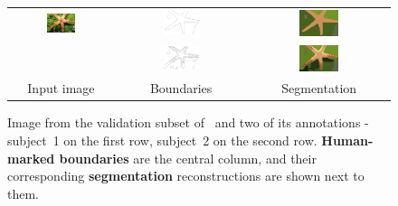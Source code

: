\begin{figure}[ht!]
\begin{center}
  \begin{tabular}{ c c c }
  \includegraphics[width=0.3\textwidth]{images/examples/starfish/starfish.png} &
  \includegraphics[width=0.3\textwidth,frame]{images/examples/starfish/starfish_bdry_coarse.png} &
  \includegraphics[width=0.3\textwidth]{images/examples/starfish/starfish_segm_coarse.png} \\
  &
  \includegraphics[width=0.3\textwidth,frame]{images/examples/starfish/starfish_bdry_detail.png} &
  \includegraphics[width=0.3\textwidth]{images/examples/starfish/starfish_segm_detail.png} \\
  Input image & Boundaries & Segmentation \\
  \end{tabular}
\end{center}
\caption[BSDS500 dataset - 2 annotations]{Image from the validation subset of~\cite{BSDS500resources} and two of its annotations - subject~1 on the first row, subject~2 on the second row. {\bf Human-marked boundaries} are the central column, and their corresponding {\bf segmentation} reconstructions are shown %
next to them.}
\label{fig:BSDS-annotations}
\end{figure}

